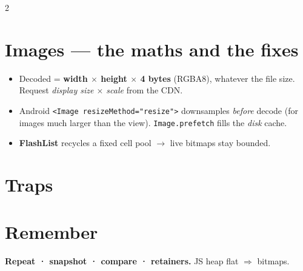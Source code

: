 \documentclass[8pt]{extarticle}
\begin{document}
\begin{multicols}{2}
\section{Images — the maths and the fixes}
\begin{itemize}\raggedright
  \item Decoded = \textbf{width $\times$ height $\times$ 4 bytes} (RGBA8), whatever the file size.
        Request \emph{display size $\times$ scale} from the CDN.
  \item Android \texttt{<Image resizeMethod="resize">} downsamples \emph{before} decode (for
        images much larger than the view). \texttt{Image.prefetch} fills the \emph{disk} cache.
  \item \textbf{FlashList} recycles a fixed cell pool $\to$ live bitmaps stay bounded.
\end{itemize}

\section{Traps}
\begin{itemize}\raggedright
\end{itemize}

\section{Remember}
\textbf{Repeat · snapshot · compare · retainers.} JS heap flat $\Rightarrow$ bitmaps.


\end{multicols}

\end{document}
